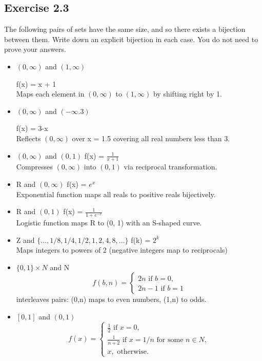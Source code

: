 \documentclass[12pt]{article}
\begin{document}
		\subsection*{Exercise 2.3}
			The following pairs of sets have the same size, and so there exists a bijection between them. Write down an explicit bijection in each case. You do not need to prove your answers.
			\begin{itemize}
				\item $(0, \infty)$ and $(1, \infty)$
				
					f(x) = x + 1 \\
					Maps each element in $(0, \infty)$ to $(1, \infty)$ by shifting right by 1.
				\item $(0, \infty)$ and $(-\infty. 3)$
				
					f(x) = 3-x \\
					Reflects $(0, \infty)$ over x = 1.5 covering all real numbers less than 3.
				\item $(0, \infty)$ and $(0, 1)$
					f(x) = $\frac{1}{x+1}$ \\
					Compresses $(0, \infty)$ into $(0, 1)$ via reciprocal transformation.
				\item R and $(0, \infty)$
					f(x) = $e^x$ \\
					Exponential function maps all reals to positive reals bijectively.
				\item R and $(0, 1)$
					f(x) = $\frac{1}{1 + e^{-x}}$ \\
					Logistic function maps R to (0, 1) with an S-shaped curve.
				\item Z and $\{..., 1/8, 1/4, 1/2, 1, 2, 4, 8, ...\}$
					f(k) = $2^k$ \\
					Maps integers to powers of 2 (negative integers map to reciprocals)
				\item $\{0,1\} \times N$ and N
					\begin{equation}
						f(b,n) =
						\left\{
						\begin{aligned}
							2n \text{ if } b=0, \\
							2n-1 \text{ if } b=1
						\end{aligned}
						\right.
					\end{equation}
					interleaves pairs: (0,n) maps to even numbers, (1,n) to odds.
				\item $[0,1]$ and $(0,1)$
					\begin{equation}
						f(x) =
						\left\{
						\begin{aligned}
							\frac{1}{2} \text{ if } x=0, \\
							\frac{1}{n+2} \text{ if } x=1/n \text{ for some } n \in N, \\
							x, \text{ otherwise}.
						\end{aligned}
						\right.
					\end{equation}
			\end{itemize}
\end{document}
